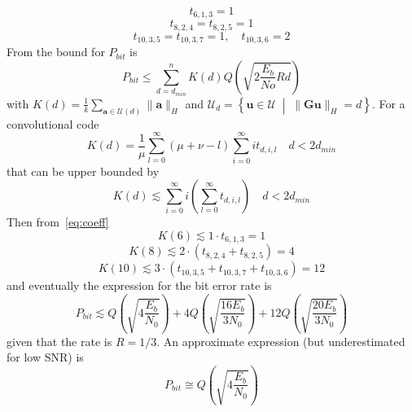 \documentclass[10pt]{article}
\begin{document}
\begin{equation*}
	t_{6,1,3} = 1
\end{equation*}
\begin{equation}\label{eq:coeff}
	t_{8,2,4} = t_{8,2,5} = 1
\end{equation}
\begin{equation*}
	t_{10, 3, 5} = t_{10, 3, 7} = 1, \quad  t_{10,3,6} = 2
\end{equation*}
From \cite{erseghe} the bound for $P_{bit}$ is
\begin{equation}
	P_{bit} \le \sum_{d=d_{min}}^n K(d)Q\left(\sqrt{2\frac{E_b}{No}Rd}\right)
\end{equation}
with $K(d) = \frac{1}{k} \sum_{\mathbf{a}\in\mathcal{U}(d)} \|\mathbf{a}\|_H$ and $\mathcal{U}_d = \left\{ \mathbf{u} \in \mathcal{U} \; \middle| \; \|\mathbf{Gu} \|_{H} = d \right\}$. For a convolutional code 
\begin{equation}
	K(d) = \frac{1}{\mu}\sum_{l=0}^{\infty} (\mu + \nu - l) \sum_{i=0}^{\infty} i t_{d,i,l} \quad d < 2d_{min}
\end{equation}
that can be upper bounded by
\begin{equation}
	K(d) \lesssim \sum_{i=0}^{\infty} i \left( \sum_{l=0}^{\infty}t_{d,i,l}\right) \quad d < 2d_{min}
\end{equation}
Then from~\eqref{eq:coeff} 
\begin{equation*}
	K(6) \lesssim 1\cdot t_{6,1,3} = 1
\end{equation*}
\begin{equation}
	K(8) \lesssim 2\cdot (t_{8,2,4} + t_{8,2,5}) = 4
\end{equation}
\begin{equation*}
	K(10) \lesssim 3\cdot (t_{10, 3, 5} + t_{10, 3, 7} + t_{10,3,6}) = 12
\end{equation*}
and eventually the expression for the bit error rate is
\begin{equation}\label{eq:BER_bound}
	P_{bit} \lesssim Q\left(\sqrt{4\frac{E_b}{N_0}} \right) + 4Q\left(\sqrt{\frac{16E_b}{3N_0}} \right) + 12Q\left(\sqrt{\frac{20E_b}{3N_0}} \right)
\end{equation}
given that the rate is $R=1/3$. An approximate expression (but underestimated for low SNR) is
\begin{equation}\label{eq:BER_approx}
	P_{bit} \cong Q\left(\sqrt{4\frac{E_b}{N_0}} \right)
\end{equation}
\end{document}
